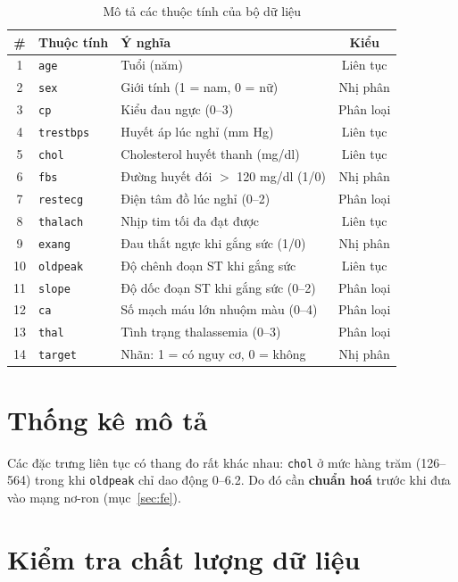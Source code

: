 \begin{table}[h]
\centering
\caption{Mô tả các thuộc tính của bộ dữ liệu}
\label{tab:attributes}
\begin{tabular}{cllc}
\toprule
\# & Thuộc tính & Ý nghĩa & Kiểu \\
\midrule
1  & \texttt{age}      & Tuổi (năm)                              & Liên tục \\
2  & \texttt{sex}      & Giới tính (1 = nam, 0 = nữ)             & Nhị phân \\
3  & \texttt{cp}       & Kiểu đau ngực (0--3)                    & Phân loại \\
4  & \texttt{trestbps} & Huyết áp lúc nghỉ (mm Hg)               & Liên tục \\
5  & \texttt{chol}     & Cholesterol huyết thanh (mg/dl)         & Liên tục \\
6  & \texttt{fbs}      & Đường huyết đói $>$ 120 mg/dl (1/0)     & Nhị phân \\
7  & \texttt{restecg}  & Điện tâm đồ lúc nghỉ (0--2)             & Phân loại \\
8  & \texttt{thalach}  & Nhịp tim tối đa đạt được                & Liên tục \\
9  & \texttt{exang}    & Đau thắt ngực khi gắng sức (1/0)        & Nhị phân \\
10 & \texttt{oldpeak}  & Độ chênh đoạn ST khi gắng sức           & Liên tục \\
11 & \texttt{slope}    & Độ dốc đoạn ST khi gắng sức (0--2)      & Phân loại \\
12 & \texttt{ca}       & Số mạch máu lớn nhuộm màu (0--4)        & Phân loại \\
13 & \texttt{thal}     & Tình trạng thalassemia (0--3)           & Phân loại \\
14 & \texttt{target}   & Nhãn: 1 = có nguy cơ, 0 = không         & Nhị phân \\
\bottomrule
\end{tabular}
\end{table}

\section{Thống kê mô tả}
Các đặc trưng liên tục có thang đo rất khác nhau: \texttt{chol} ở mức hàng trăm
(126--564) trong khi \texttt{oldpeak} chỉ dao động 0--6.2. Do đó cần
\textbf{chuẩn hoá} trước khi đưa vào mạng nơ-ron (mục~\ref{sec:fe}).

\section{Kiểm tra chất lượng dữ liệu}


